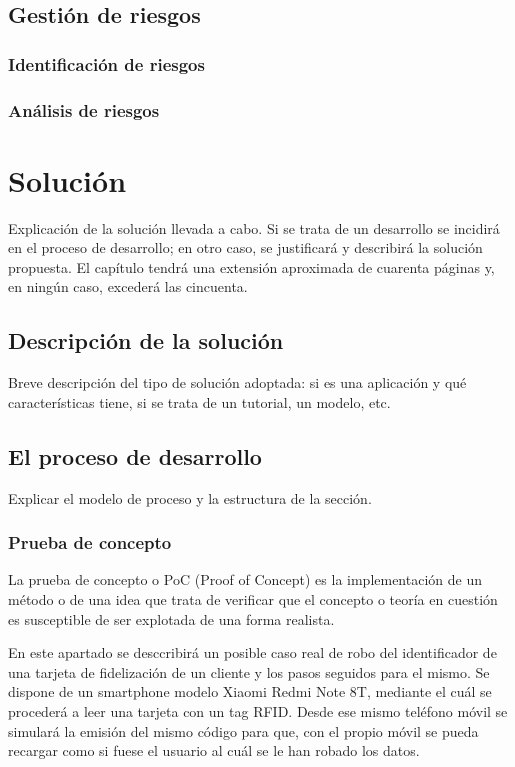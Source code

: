 \documentclass[12pt,a4paper,onecolumn,oneside]{report}
\begin{document}
\section{Gestión de riesgos}

\subsection{Identificación de riesgos}

\subsection{Análisis de riesgos}



\chapter{Solución}
\label{Solución}

Explicación de la solución llevada a cabo. Si se trata de un desarrollo se incidirá en el proceso de desarrollo; en otro caso, se justificará y describirá la solución propuesta. El capítulo tendrá una extensión aproximada de cuarenta páginas y, en ningún caso, excederá las cincuenta.

\section{Descripción de la solución}

Breve descripción del tipo de solución adoptada: si es una aplicación y qué características tiene, si se trata de un tutorial, un modelo, etc.


\section{El proceso de desarrollo}

Explicar el modelo de proceso y la estructura de la sección.

\subsection{Prueba de concepto}

La prueba de concepto o PoC (Proof of Concept) es la implementación de un método o de una idea que trata de verificar que el concepto o teoría en cuestión es susceptible de ser explotada de una forma realista.

En este apartado se desccribirá un posible caso real de robo del identificador de una tarjeta de fidelización de un cliente y los pasos seguidos para el mismo. Se dispone de un smartphone modelo Xiaomi Redmi Note 8T, mediante el cuál se procederá a leer una tarjeta con un tag RFID. Desde ese mismo teléfono móvil se simulará la emisión del mismo código para que, con el propio móvil se pueda recargar como si fuese el usuario al cuál se le han robado los datos.
\end{document}
